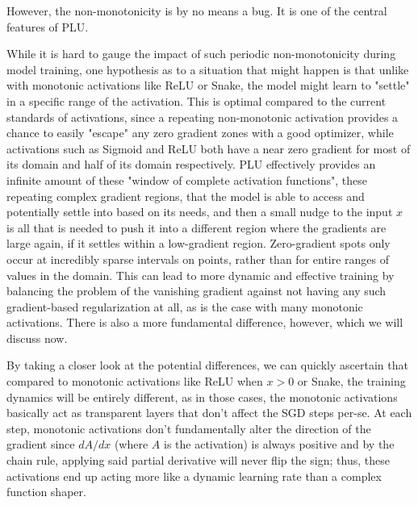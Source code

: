 \documentclass[11pt, letterpaper]{article}
\begin{document}
However, the non-monotonicity is by no means a bug. It is one of the central features of PLU.

While it is hard to gauge the impact of such periodic non-monotonicity during model training, one hypothesis as to a situation that might happen is that unlike with monotonic activations like ReLU or Snake, the model might learn to "settle" in a specific range of the activation. This is optimal compared to the current standards of activations, since a repeating non-monotonic activation provides a chance to easily "escape" any zero gradient zones with a good optimizer, while activations such as Sigmoid and ReLU both have a near zero gradient for most of its domain and half of its domain respectively. PLU effectively provides an infinite amount of these "window of complete activation functions", these repeating complex gradient regions, that the model is able to access and potentially settle into based on its needs, and then a small nudge to the input $x$ is all that is needed to push it into a different region where the gradients are large again, if it settles within a low-gradient region. Zero-gradient spots only occur at incredibly sparse intervals on points, rather than for entire ranges of values in the domain. This can lead to more dynamic and effective training by balancing the problem of the vanishing gradient against not having any such gradient-based regularization at all, as is the case with many monotonic activations. There is also a more fundamental difference, however, which we will discuss now.

By taking a closer look at the potential differences, we can quickly ascertain that compared to monotonic activations like ReLU when $x>0$ or Snake, the training dynamics will be entirely different, as in those cases, the monotonic activations basically act as transparent layers that don't affect the SGD steps per-se. At each step, monotonic activations don't fundamentally alter the direction of the gradient since $dA/dx$ (where $A$ is the activation) is always positive and by the chain rule, applying said partial derivative will never flip the sign; thus, these activations end up acting more like a dynamic learning rate than a complex function shaper.
\end{document}
